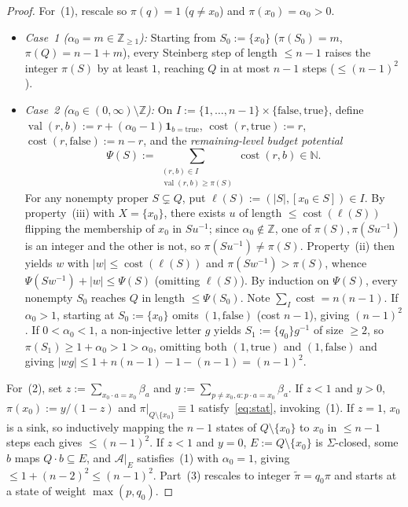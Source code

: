 \documentclass[11pt,a4paper]{article}
\theoremstyle{definition}
\theoremstyle{remark}
\newcommand{\one}{\mathbf{1}}
\newcommand{\Z}{\mathbb{Z}}
\newcommand{\N}{\mathbb{N}}
\newcommand{\cA}{\mathcal{A}}
\begin{document}
\begin{proof}
For~(1), rescale so $\pi(q) = 1$ ($q \neq x_0$) and $\pi(x_0) = \alpha_0 > 0$.
\begin{itemize}[nosep]
  \item \emph{Case~1 ($\alpha_0 = m \in \Z_{\ge 1}$):} Starting from $S_0 := \{x_0\}$ ($\pi(S_0) = m$, $\pi(Q) = n - 1 + m$), every Steinberg step of length $\le n - 1$ raises the integer $\pi(S)$ by at least $1$, reaching $Q$ in at most $n - 1$ steps ($\le (n-1)^2$).
  \item \emph{Case~2 ($\alpha_0 \in (0, \infty) \setminus \Z$):} On $I := \{1, \dots, n - 1\} \times \{\mathrm{false}, \mathrm{true}\}$, define $\operatorname{val}(r, b) := r + (\alpha_0 - 1)\one_{b = \mathrm{true}}$, $\operatorname{cost}(r, \mathrm{true}) := r$, $\operatorname{cost}(r, \mathrm{false}) := n - r$, and the \emph{remaining-level budget potential}
  \[
    \Psi(S) := \sum_{\substack{(r, b) \in I \\ \operatorname{val}(r, b) \ge \pi(S)}} \operatorname{cost}(r, b) \in \N.
  \]
  For any nonempty proper $S \subsetneq Q$, put $\ell(S) := (|S|, [x_0 \in S]) \in I$. By property~(iii) with $X = \{x_0\}$, there exists $u$ of length $\le \operatorname{cost}(\ell(S))$ flipping the membership of $x_0$ in $S u^{-1}$; since $\alpha_0 \notin \Z$, one of $\pi(S), \pi(S u^{-1})$ is an integer and the other is not, so $\pi(S u^{-1}) \neq \pi(S)$. Property~(ii) then yields $w$ with $|w| \le \operatorname{cost}(\ell(S))$ and $\pi(S w^{-1}) > \pi(S)$, whence $\Psi(S w^{-1}) + |w| \le \Psi(S)$ (omitting $\ell(S)$). By induction on $\Psi(S)$, every nonempty $S_0$ reaches $Q$ in length $\le \Psi(S_0)$. Note $\sum_I \operatorname{cost} = n(n - 1)$. If $\alpha_0 > 1$, starting at $S_0 := \{x_0\}$ omits $(1, \mathrm{false})$ (cost $n - 1$), giving $(n - 1)^2$. If $0 < \alpha_0 < 1$, a non-injective letter $g$ yields $S_1 := \{q_0\}g^{-1}$ of size $\ge 2$, so $\pi(S_1) \ge 1 + \alpha_0 > 1 > \alpha_0$, omitting both $(1, \mathrm{true})$ and $(1, \mathrm{false})$ and giving $|w g| \le 1 + n(n-1) - 1 - (n-1) = (n-1)^2$.
\end{itemize}
For~(2), set $z := \sum_{x_0 \cdot a = x_0} \beta_a$ and $y := \sum_{p \neq x_0, a : p \cdot a = x_0} \beta_a$. If $z < 1$ and $y > 0$, $\pi(x_0) := y/(1 - z)$ and $\pi|_{Q \setminus \{x_0\}} \equiv 1$ satisfy~\eqref{eq:stat}, invoking~(1). If $z = 1$, $x_0$ is a sink, so inductively mapping the $n - 1$ states of $Q \setminus \{x_0\}$ to $x_0$ in $\le n - 1$ steps each gives $\le (n-1)^2$. If $z < 1$ and $y = 0$, $E := Q \setminus \{x_0\}$ is $\Sigma$-closed, some $b$ maps $Q \cdot b \subseteq E$, and $\cA|_E$ satisfies~(1) with $\alpha_0 = 1$, giving $\le 1 + (n-2)^2 \le (n-1)^2$. Part~(3) rescales to integer $\tilde{\pi} = q_0 \pi$ and starts at a state of weight $\max(p, q_0)$.
\end{proof}
\end{document}

